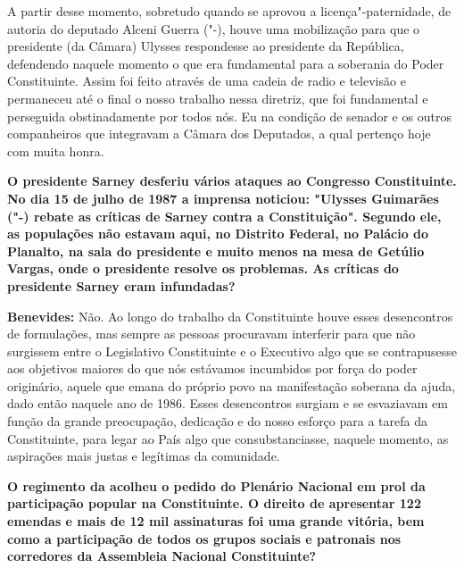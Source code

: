 A partir desse momento, sobretudo quando se aprovou a
licença"-paternidade, de autoria do deputado Alceni Guerra ("-),
houve uma mobilização para que o presidente (da Câmara) Ulysses
respondesse ao presidente da República, defendendo naquele momento o que
era fundamental para a soberania do Poder Constituinte. Assim foi feito
através de uma cadeia de radio e televisão e permaneceu até o final o
nosso trabalho nessa diretriz, que foi fundamental e perseguida
obstinadamente por todos nós. Eu na condição de senador e os outros
companheiros que integravam a Câmara dos Deputados, a qual pertenço hoje
com muita honra.

\textbf{O presidente Sarney desferiu vários ataques ao Congresso
Constituinte. No dia 15 de julho de 1987 a imprensa noticiou: "Ulysses
Guimarães ("-) rebate as críticas de Sarney contra a Constituição".
Segundo ele, as populações não estavam aqui, no Distrito Federal, no
Palácio do Planalto, na sala do presidente e muito menos na mesa de
Getúlio Vargas, onde o presidente resolve os problemas. As críticas do
presidente Sarney eram infundadas?}

\textbf{Benevides:} Não. Ao longo do trabalho da Constituinte houve
esses desencontros de formulações, mas sempre as pessoas procuravam
interferir para que não surgissem entre o Legislativo Constituinte e o
Executivo algo que se contrapusesse aos objetivos maiores do que nós
estávamos incumbidos por força do poder originário, aquele que emana do
próprio povo na manifestação soberana da ajuda, dado então naquele ano
de 1986. Esses desencontros surgiam e se esvaziavam em função da grande
preocupação, dedicação e do nosso esforço para a tarefa da Constituinte,
para legar ao País algo que consubstanciasse, naquele momento, as
aspirações mais justas e legítimas da comunidade.

\textbf{O regimento da  acolheu o pedido do Plenário Nacional em prol
da participação popular na Constituinte. O direito de apresentar 122
emendas e mais de 12 mil assinaturas foi uma grande vitória, bem como a
participação de todos os grupos sociais e patronais nos corredores da
Assembleia Nacional Constituinte?}

